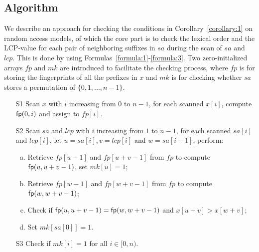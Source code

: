 \documentclass[10pt,journal,compsoc]{IEEEtran}
\begin{document}
\subsection{Algorithm} \label{sec:method1:algorithm}

We describe an approach for checking the conditions in Corollary~\ref{corollary:1} on random access models, of which the core part is to check the lexical order and the LCP-value for each pair of neighboring suffixes in $sa$ during the scan of $sa$ and $lcp$. This is done by using Formulas~\ref{formula:1}-\ref{formula:3}. Two zero-initialized arrays $fp$ and $mk$ are introduced to facilitate the checking process, where $fp$ is for storing the fingerprints of all the prefixes in $x$ and $mk$ is for checking whether $sa$ stores a permutation of $\{0, 1, ..., n - 1\}$.

\begin{enumerate}
	\item [S1]
	Scan $x$ with $i$ increasing from $0$ to $n - 1$, for each scanned $x[i]$, compute ${\sf fp}(0, i)$ and assign to $fp[i]$.
	
	\item [S2]
	Scan $sa$ and $lcp$ with $i$ increasing from $1$ to $n - 1$, for each scanned $sa[i]$ and $lcp[i]$, let $u = sa[i], v = lcp[i]$ and $w = sa[i - 1]$, perform:
	
	\begin{enumerate}[(a)]
		\item
		Retrieve $fp[u - 1]$ and $fp[u + v - 1]$ from $fp$ to compute ${\sf fp}(u, u + v - 1)$, set $mk[u]=1$;
		
		\item
		Retrieve $fp[w - 1]$ and $fp[w + v - 1]$ from $fp$ to compute ${\sf fp}(w, w + v - 1)$;
		
		\item
		Check if ${\sf fp}(u, u + v - 1) = {\sf fp}(w, w + v - 1)$ and $x[u + v] > x[w + v]$;
		
		\item
		Set $mk[sa[0]] = 1$.
	\end{enumerate}

	\item [S3] Check if $mk[i] = 1$ for all $i \in [0, n)$.
	
\end{enumerate}
\end{document}
